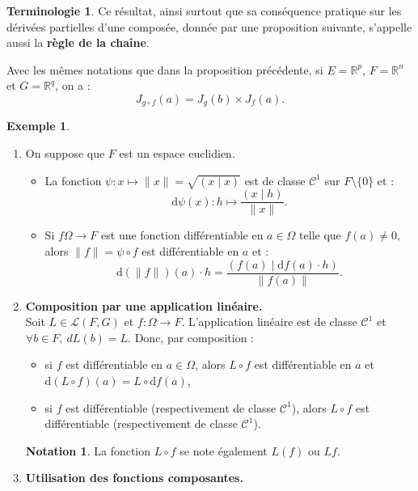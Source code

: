 \documentclass[french]{article}
\newcommand{\R}{\mathbb{R}}
\renewcommand{\d}{\text{d}}
\theoremstyle{plain}
\theoremstyle{definition}
\newtheorem*{ex}{Exemple}
\newtheorem*{notation}{Notation}
\newtheorem*{terminologie}{Terminologie}
\theoremstyle{remark}
\begin{document}
\begin{terminologie}
	Ce résultat, ainsi surtout que sa conséquence pratique sur les dérivées partielles d'une composée, donnée par une proposition suivante, s'appelle aussi la \textbf{règle de la chaîne}.
\end{terminologie}

\begin{prop}
	Avec les mêmes notations que dans la proposition précédente, si $E=\R^p$, $F=\R^n$ et $G=\R^q$, on a :
	$$J_{g\circ f}(a)=J_g(b)\times J_f(a).$$
\end{prop}

\begin{ex}
	\begin{enumerate}
		\item On suppose que $F$ est un espace euclidien. \\
		\begin{itemize}
			\item La fonction $\psi:x\mapsto\lVert x\rVert=\sqrt{(x\mid x)}$ est de classe $\mathcal{C}^1$ sur $F\setminus\{0\}$ et :
			$$\d\psi(x):h\mapsto\frac{(x\mid h)}{\lVert x\rVert}.$$
			\item Si $f\Omega\to F$ est une fonction différentiable en $a\in\Omega$ telle que $f(a)\ne0$, alors $\lVert f\rVert=\psi\circ f$ est différentiable en $a$ et :
			$$\d (\lVert f\rVert)(a)\cdot h=\frac{(f(a)\mid\d f(a)\cdot h)}{\lVert f(a)\rVert}.$$
		\end{itemize}
		\item \textbf{Composition par une application linéaire.}\\
		Soit $L\in\mathcal{L}(F,G)$ et $f:\Omega\to F$. L'application linéaire est de classe $\mathcal{C}^1$ et $\forall b\in F,\ dL(b)=L$. Donc, par composition :
		\begin{itemize}
			\item si $f$ est différentiable en $a\in\Omega$, alors $L\circ f$ est différentiable en $a$ et $\d (L\circ f)(a)=L\circ\d f(a)$,
			\item si $f$ est différentiable (respectivement de classe $\mathcal{C}^1$), alors $L\circ f$ est différentiable (respectivement de classe $\mathcal{C}^1$).
		\end{itemize}
		\begin{notation}
			La fonction $L\circ f$ se note également $L(f)$ ou $Lf$.
		\end{notation}
		\item \textbf{Utilisation des fonctions composantes.}\\

\end{enumerate}
\end{ex}
\end{document}
